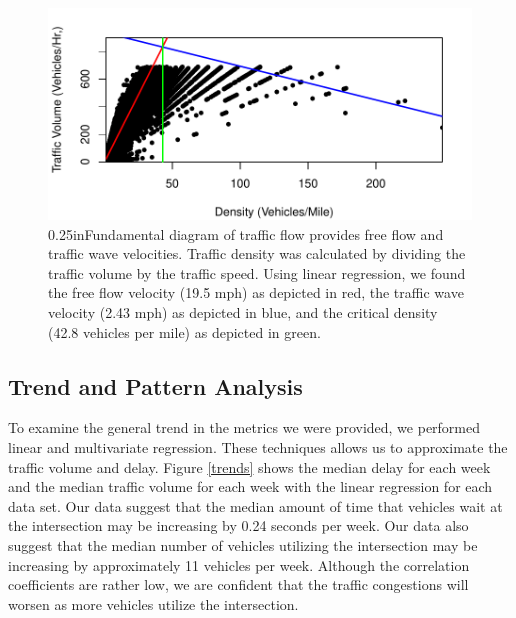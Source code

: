 \documentclass{report}
\begin{document}
\begin{figure}[h]
\centering
\includegraphics{upstat_report-003}
\caption{\rightskip0.25inFundamental diagram of traffic flow provides
free flow and traffic wave velocities. Traffic density was calculated by
dividing the traffic volume by the traffic speed. Using linear regression, we
found the free flow velocity (19.5 mph) as depicted in red, the traffic wave
velocity (2.43 mph) as depicted in blue, and the critical density (42.8 vehicles
per mile) as depicted in green.}
\label{fig:Fundamental}
\end{figure}


\subsection*{Trend and Pattern Analysis}

To examine the general trend in the metrics we were provided, we performed linear
and multivariate regression. These techniques allows us to approximate the traffic
volume and delay. Figure \ref{trends} shows the median delay for each week and
the median traffic volume for each week with the linear regression for each data
set. Our data suggest that the median amount of time that vehicles wait at the
intersection may be increasing by 0.24 seconds per week. Our data also suggest
that the median number of vehicles utilizing the intersection may be increasing
by approximately 11 vehicles per week. Although the correlation coefficients are
rather low, we are confident that the traffic congestions will worsen as more
vehicles utilize the intersection.
\end{document}
